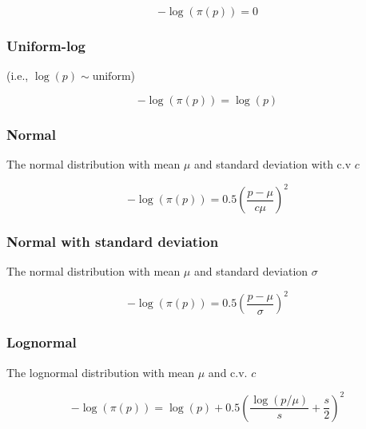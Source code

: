 \begin{equation}
 - \log \left(\pi \left(p \right) \right) = 0
\end{equation}

\subsubsection{Uniform-log} (i.e., $\log(p) \sim \text{uniform}$)\label{sec:Prior-UniformLog}

\begin{equation}
 - \log \left(\pi \left(p \right) \right) = \log \left( p \right)
\end{equation}

\subsubsection{Normal}\label{sec:Prior-Normal}

The normal distribution with mean $\mu$ and standard deviation with c.v $c$

\begin{equation}
 - \log \left(\pi \left(p \right) \right) = 0.5\left(\frac{p - \mu}{c\mu} \right)^2
\end{equation}

\subsubsection{Normal with standard deviation}\label{sec:Prior-NormalByStdev}

The normal distribution with mean $\mu$ and standard deviation $\sigma$

\begin{equation}
 - \log \left(\pi \left(p \right) \right) = 0.5\left(\frac{p - \mu}
{\sigma }\right)^2
\end{equation}

\subsubsection{Lognormal}\label{sec:Prior-Lognormal}

The lognormal distribution with mean $\mu$ and c.v. $c$

\begin{equation}
 - \log \left(\pi \left(p \right) \right) = \log \left( p \right) + 0.5 \left( \frac{\log \left( p / \mu \right)}{s} + \frac{s}{2} \right)^2
\end{equation}

